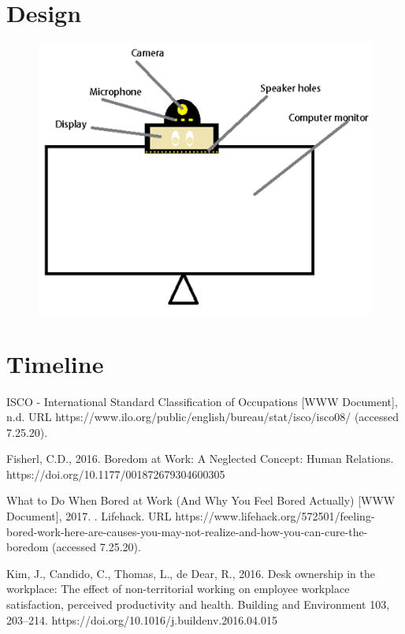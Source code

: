 \documentclass{article}
\begin{document}
	\section{Design}
	\begin{figure}[H]
		\centering
		\includegraphics[width=1\textwidth]{design.png}
		\\[25pt]
	\end{figure}
	
	\section{Timeline}
	\begin{landscape}
		
	\end{landscape}
	
	\newpage
	\begin{thebibliography}{9}
	ISCO - International Standard Classification of Occupations [WWW Document], n.d. URL https://www.ilo.org/public/english/bureau/stat/isco/isco08/ (accessed 7.25.20).
	
	Fisherl, C.D., 2016. Boredom at Work: A Neglected Concept: Human Relations. https://doi.org/10.1177/001872679304600305
	
	What to Do When Bored at Work (And Why You Feel Bored Actually) [WWW Document], 2017. . Lifehack. URL https://www.lifehack.org/572501/feeling-bored-work-here-are-causes-you-may-not-realize-and-how-you-can-cure-the-boredom (accessed 7.25.20).
	
	Kim, J., Candido, C., Thomas, L., de Dear, R., 2016. Desk ownership in the workplace: The effect of non-territorial working on employee workplace satisfaction, perceived productivity and health. Building and Environment 103, 203–214. https://doi.org/10.1016/j.buildenv.2016.04.015
	
		
	\end{thebibliography}
	
\end{document}
